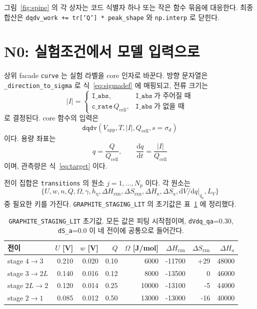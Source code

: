 \documentclass[11pt,a4paper]{article}
\newcommand{\dd}{\mathrm{d}}
\newcommand{\app}{\mathrm{app}}
\newcommand{\cell}{\mathrm{cell}}
\begin{document}
그림~\ref{fig:spine} 의 각 상자는 코드 식별자 하나 또는 작은 함수 묶음에 대응한다. 최종 합산은 \texttt{dqdv\_work += tr['Q'] * peak\_shape} 와 \texttt{np.interp} 로 닫힌다.

\tableofcontents
\newpage

\section{N0: 실험조건에서 모델 입력으로}\label{sec:n0}
상위 facade \texttt{curve} 는 실험 라벨을 core 인자로 바꾼다. 방향 문자열은 \texttt{\_direction\_to\_sigma} 로 식~\eqref{eq:sigmadef} 에 매핑되고, 전류 크기는
\begin{equation}
|I|=\begin{cases}
\texttt{I\_abs},&\texttt{I\_abs}\ \text{가 주어질 때}\\
\texttt{c\_rate}\,Q_\cell,&\texttt{I\_abs}\ \text{가 없을 때}
\end{cases}
\label{eq:Iabs}
\end{equation}
로 결정된다. core 함수의 입력은
\begin{equation}
\texttt{dqdv}(V_\app,T,|I|,Q_\cell,s=\sigma_d)
\label{eq:dqdvcall}
\end{equation}
이다. 용량 좌표는
\begin{equation}
q=\frac{Q}{Q_\cell},\qquad \frac{\dd q}{\dd t}=\frac{|I|}{Q_\cell}
\label{eq:qdef}
\end{equation}
이며, 관측량은 식~\eqref{eq:target} 이다.

전이 집합은 \texttt{transitions} 의 원소 $j=1,\dots,N_p$ 이다. 각 원소는
\begin{equation}
\{U,w,n,Q,\Omega,\gamma,h_\eta,\Delta H_{\mathrm{rxn}},\Delta S_{\mathrm{rxn}},\Delta H_a,\Delta S_a,\dd V/\dd q|_{q_a},L_V\}
\label{eq:trdict}
\end{equation}
중 필요한 키를 가진다. \texttt{GRAPHITE\_STAGING\_LIT} 의 초기값은 표~\ref{tab:staging} 에 정리했다.

\begin{table}[t]
\centering
\renewcommand{\arraystretch}{1.25}
\begin{tabular}{lrrrrrrr}
\toprule
전이 & $U$ [V] & $w$ [V] & $Q$ & $\Omega$ [J/mol] & $\Delta H_{\mathrm{rxn}}$ & $\Delta S_{\mathrm{rxn}}$ & $\Delta H_a$\\
\midrule
stage $4\to3$ & 0.210 & 0.020 & 0.10 & 6000 & -11700 & +29 & 48000\\
stage $3\to2L$ & 0.140 & 0.016 & 0.12 & 8000 & -13500 & 0 & 46000\\
stage $2L\to2$ & 0.120 & 0.014 & 0.25 & 10000 & -13100 & -5 & 44000\\
stage $2\to1$ & 0.085 & 0.012 & 0.50 & 13000 & -13000 & -16 & 40000\\
\bottomrule
\end{tabular}
\caption{\texttt{GRAPHITE\_STAGING\_LIT} 초기값. 모든 값은 피팅 시작점이며, \texttt{dVdq\_qa}=0.30, \texttt{dS\_a}=0.0 이 네 전이에 공통으로 들어간다.}
\label{tab:staging}
\end{table}
\end{document}
